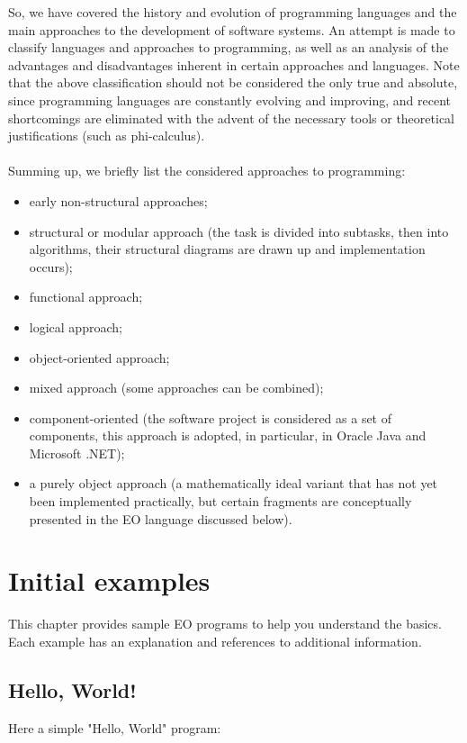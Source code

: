\documentclass[12pt]{book}
\begin{document}
So, we have covered the  history and evolution of programming languages  and the main approaches to the development of software systems. An attempt is made to classify languages and approaches to programming, as well as an analysis of the advantages and disadvantages inherent in certain approaches and languages. Note that the above classification should not be considered the only true and absolute, since programming languages are constantly evolving and improving, and recent shortcomings are eliminated with the advent of the necessary tools or theoretical justifications (such as phi-calculus).
\\
\\
Summing up, we briefly list the considered approaches to programming:
\begin{itemize}
    \item early non-structural approaches;
    \item structural or modular approach (the task is divided into subtasks, then into algorithms, their structural diagrams are drawn up and implementation occurs);
    \item functional  approach;
    \item logical approach;
    \item object-oriented approach;
    \item mixed approach (some approaches can be combined);
    \item component-oriented (the software project is considered as a set of components, this approach is adopted, in particular, in Oracle Java and Microsoft .NET);
    \item a purely object approach (a mathematically ideal variant that has not yet been implemented practically, but certain fragments are conceptually presented in the EO language discussed below).
\end{itemize}

\chapter{Initial examples}

This chapter provides sample EO programs to help you understand the basics. Each example has an explanation and references to additional information.

\section{Hello, World!}
Here a simple "Hello, World" program:
\end{document}
